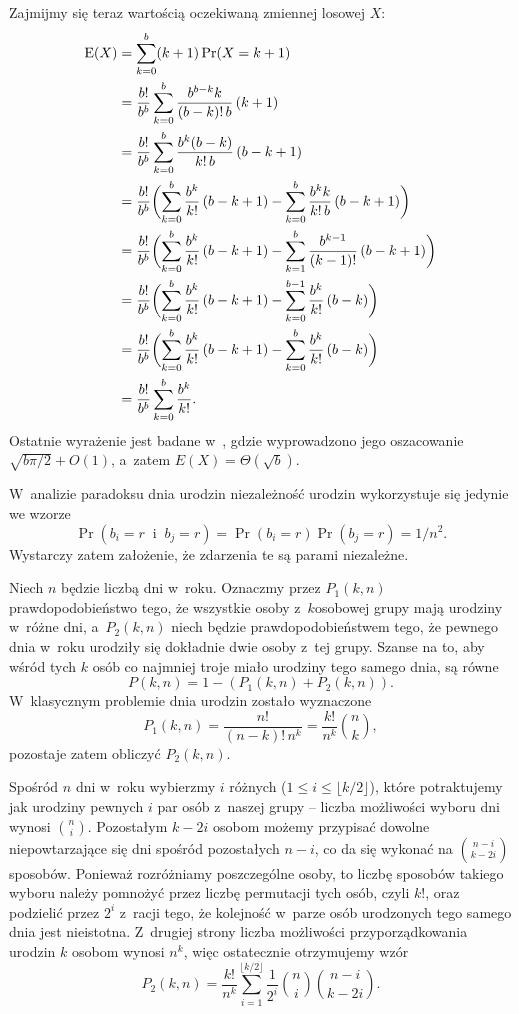 Zajmijmy się teraz wartością oczekiwaną zmiennej losowej $X$:
\begin{align*}
	\operatorname{E}(X) &= \sum_{k=0}^b(k+1)\Pr(X=k+1) \\
	&= \frac{b!}{b^b}\sum_{k=0}^b\frac{b^{b-k}k}{(b-k)!\,b}\,(k+1) \\
	&= \frac{b!}{b^b}\sum_{k=0}^b\frac{b^k(b-k)}{k!\,b}\,(b-k+1) \\
	&= \frac{b!}{b^b}\biggl(\sum_{k=0}^b\frac{b^k}{k!}\,(b-k+1)-\sum_{k=0}^b\frac{b^kk}{k!\,b}\,(b-k+1)\biggr) \\
	&= \frac{b!}{b^b}\biggl(\sum_{k=0}^b\frac{b^k}{k!}\,(b-k+1)-\sum_{k=1}^b\frac{b^{k-1}}{(k-1)!}\,(b-k+1)\biggr) \\
	&= \frac{b!}{b^b}\biggl(\sum_{k=0}^b\frac{b^k}{k!}\,(b-k+1)-\sum_{k=0}^{b-1}\frac{b^k}{k!}\,(b-k)\biggr) \\
	&= \frac{b!}{b^b}\biggl(\sum_{k=0}^b\frac{b^k}{k!}\,(b-k+1)-\sum_{k=0}^b\frac{b^k}{k!}\,(b-k)\biggr) \\
	&= \frac{b!}{b^b}\sum_{k=0}^b\frac{b^k}{k!}.
\end{align*}
Ostatnie wyrażenie jest badane w~\cite{taocp1frag}, gdzie wyprowadzono jego oszacowanie $\sqrt{b\pi/2}+O(1)$, a~zatem $E(X)=\Theta(\!\sqrt{b})$.

\exercise %
W~analizie paradoksu dnia urodzin niezależność urodzin wykorzystuje się jedynie we wzorze
\[
    \Pr(b_i=r\;\;\text{i}\;\;b_j=r) = \Pr(b_i=r)\Pr(b_j=r) = 1/n^2.
\]
Wystarczy zatem założenie, że zdarzenia te są parami niezależne.

\exercise %
Niech $n$ będzie liczbą dni w~roku.
Oznaczmy przez $P_1(k,n)$ prawdopodobieństwo tego, że wszystkie osoby z~$k$\nbhyphen osobowej grupy mają urodziny w~różne dni, a~$P_2(k,n)$ niech będzie prawdopodobieństwem tego, że pewnego dnia w~roku urodziły się dokładnie dwie osoby z~tej grupy.
Szanse na to, aby wśród tych $k$ osób co najmniej troje miało urodziny tego samego dnia, są równe
\[
	P(k,n) = 1-(P_1(k,n)+P_2(k,n)).
\]
W~klasycznym problemie dnia urodzin zostało wyznaczone
\[
	P_1(k,n) = \frac{n!}{(n-k)!\,n^k} = \frac{k!}{n^k}\binom{n}{k},
\]
pozostaje zatem obliczyć $P_2(k,n)$.

Spośród $n$ dni w~roku wybierzmy $i$ różnych ($1\le i\le\lfloor k/2\rfloor$), które potraktujemy jak urodziny pewnych $i$ par osób z~naszej grupy -- liczba możliwości wyboru dni wynosi $\binom{n}{i}$.
Pozostałym $k-2i$ osobom możemy przypisać dowolne niepowtarzające się dni spośród pozostałych $n-i$, co da się wykonać na $\binom{n-i}{k-2i}$ sposobów.
Ponieważ rozróżniamy poszczególne osoby, to liczbę sposobów takiego wyboru należy pomnożyć przez liczbę permutacji tych osób, czyli $k!$, oraz podzielić przez $2^i$ z~racji tego, że kolejność w~parze osób urodzonych tego samego dnia jest nieistotna.
Z~drugiej strony liczba możliwości przyporządkowania urodzin $k$ osobom wynosi $n^k$, więc ostatecznie otrzymujemy wzór
\[
	P_2(k,n) = \frac{k!}{n^k}\sum_{i=1}^{\lfloor k/2\rfloor}\frac{1}{2^i}\binom{n}{i}\binom{n-i}{k-2i}.
\]

